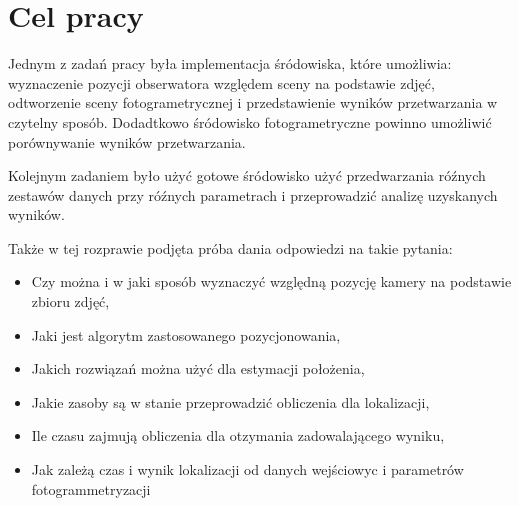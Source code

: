 \pagebreak

\section{Cel pracy}

Jednym z zadań pracy była implementacja śródowiska, które umożliwia: wyznaczenie pozycji obserwatora względem sceny na podstawie zdjęć, odtworzenie sceny fotogrametrycznej i przedstawienie wyników przetwarzania w czytelny sposób.
Dodadtkowo śródowisko fotogrametryczne powinno umożliwić porównywanie wyników przetwarzania.

Kolejnym zadaniem było użyć gotowe śródowisko użyć przedwarzania róźnych zestawów danych przy róźnych parametrach i przeprowadzić analizę uzyskanych wyników.

Także w tej rozprawie podjęta próba dania odpowiedzi na takie pytania:
\begin{itemize}
   \item Czy można i w jaki sposób wyznaczyć względną pozycję kamery na podstawie zbioru zdjęć,
   \item Jaki jest algorytm zastosowanego pozycjonowania,
   \item Jakich rozwiązań można użyć dla estymacji położenia,
   \item Jakie zasoby są w stanie przeprowadzić obliczenia dla lokalizacji,
   \item Ile czasu zajmują obliczenia dla otzymania zadowalającego wyniku,
   \item Jak zależą czas i wynik lokalizacji od danych wejściowyc i parametrów fotogrammetryzacji
\end{itemize}
